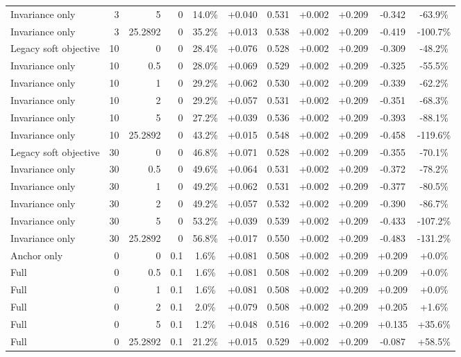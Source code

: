 \begin{table}[htbp]
\begin{tabular}{lrrrccccccc}
Invariance only & 3 & 5 & 0 & 14.0\% & +0.040 & 0.531 & +0.002 & +0.209 & -0.342 & -63.9\% \\
Invariance only & 3 & 25.2892 & 0 & 35.2\% & +0.013 & 0.538 & +0.002 & +0.209 & -0.419 & -100.7\% \\
Legacy soft objective & 10 & 0 & 0 & 28.4\% & +0.076 & 0.528 & +0.002 & +0.209 & -0.309 & -48.2\% \\
Invariance only & 10 & 0.5 & 0 & 28.0\% & +0.069 & 0.529 & +0.002 & +0.209 & -0.325 & -55.5\% \\
Invariance only & 10 & 1 & 0 & 29.2\% & +0.062 & 0.530 & +0.002 & +0.209 & -0.339 & -62.2\% \\
Invariance only & 10 & 2 & 0 & 29.2\% & +0.057 & 0.531 & +0.002 & +0.209 & -0.351 & -68.3\% \\
Invariance only & 10 & 5 & 0 & 27.2\% & +0.039 & 0.536 & +0.002 & +0.209 & -0.393 & -88.1\% \\
Invariance only & 10 & 25.2892 & 0 & 43.2\% & +0.015 & 0.548 & +0.002 & +0.209 & -0.458 & -119.6\% \\
Legacy soft objective & 30 & 0 & 0 & 46.8\% & +0.071 & 0.528 & +0.002 & +0.209 & -0.355 & -70.1\% \\
Invariance only & 30 & 0.5 & 0 & 49.6\% & +0.064 & 0.531 & +0.002 & +0.209 & -0.372 & -78.2\% \\
Invariance only & 30 & 1 & 0 & 49.2\% & +0.062 & 0.531 & +0.002 & +0.209 & -0.377 & -80.5\% \\
Invariance only & 30 & 2 & 0 & 49.2\% & +0.057 & 0.532 & +0.002 & +0.209 & -0.390 & -86.7\% \\
Invariance only & 30 & 5 & 0 & 53.2\% & +0.039 & 0.539 & +0.002 & +0.209 & -0.433 & -107.2\% \\
Invariance only & 30 & 25.2892 & 0 & 56.8\% & +0.017 & 0.550 & +0.002 & +0.209 & -0.483 & -131.2\% \\
Anchor only & 0 & 0 & 0.1 & 1.6\% & +0.081 & 0.508 & +0.002 & +0.209 & +0.209 & +0.0\% \\
Full & 0 & 0.5 & 0.1 & 1.6\% & +0.081 & 0.508 & +0.002 & +0.209 & +0.209 & +0.0\% \\
Full & 0 & 1 & 0.1 & 1.6\% & +0.081 & 0.508 & +0.002 & +0.209 & +0.209 & +0.0\% \\
Full & 0 & 2 & 0.1 & 2.0\% & +0.079 & 0.508 & +0.002 & +0.209 & +0.205 & +1.6\% \\
Full & 0 & 5 & 0.1 & 1.2\% & +0.048 & 0.516 & +0.002 & +0.209 & +0.135 & +35.6\% \\
Full & 0 & 25.2892 & 0.1 & 21.2\% & +0.015 & 0.529 & +0.002 & +0.209 & -0.087 & +58.5\% \\

\end{tabular}
\end{table}
